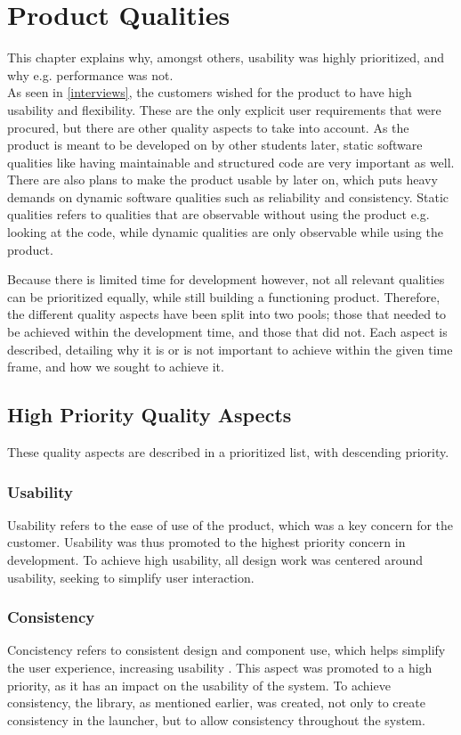 \chapter{Product Qualities}
\label{product_quality}
This chapter explains why, amongst others, usability was highly prioritized, and why e.g. performance was not.\\

As seen in \autoref{interviews}, the customers wished for the product to have high usability and flexibility. 
These are the only explicit user requirements that were procured, but there are other quality aspects to take into account. 
As the product is meant to be developed on by other students later, static software qualities like having maintainable and structured code are very important as well. 
There are also plans to make the product usable by \autists[] later on, which puts heavy demands on dynamic software qualities such as reliability and consistency. 
Static qualities refers to qualities that are observable without using the product e.g. looking at the code, while dynamic qualities are only observable while using the product.\newline

Because there is limited time for development however, not all relevant qualities can be prioritized equally, while still building a functioning product. 
Therefore, the different quality aspects have been split into two pools; those that needed to be achieved within the development time, and those that did not. 
Each aspect is described, detailing why it is or is not important to achieve within the given time frame, and how we sought to achieve it. 

\section{High Priority Quality Aspects}
These quality aspects are described in a prioritized list, with descending priority. 

\subsection{Usability}
Usability refers to the ease of use of the product, which was a key concern for the customer.
Usability was thus promoted to the highest priority concern in development. 
To achieve high usability, all design work was centered around usability, seeking to simplify user interaction. 

\subsection{Consistency}
Concistency refers to consistent design and component use, which helps simplify the user experience, increasing usability \citep[p. 90]{dieb-book}. 
This aspect was promoted to a high priority, as it has an impact on the usability of the system. 
To achieve consistency, the \guicomponents[] library, as mentioned earlier, was created, not only to create consistency in the launcher, but to allow consistency throughout the system. 

